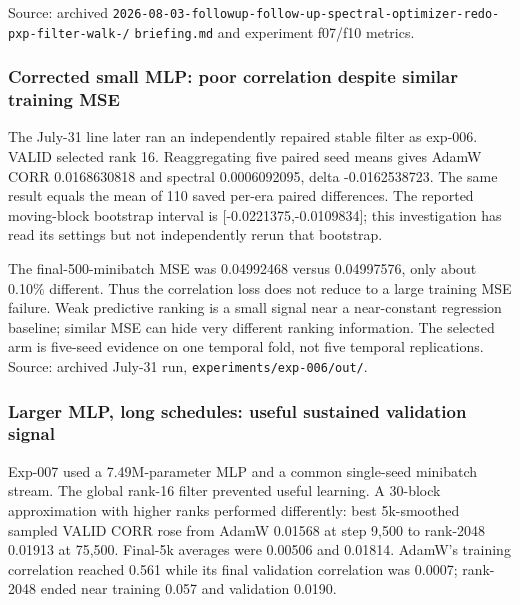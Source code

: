 \documentclass[
  british,
  10pt,
  a4paper,
]{article}
\begin{document}
Source: archived
\texttt{2026-\allowbreak{}08-\allowbreak{}03-\allowbreak{}followup-\allowbreak{}follow-\allowbreak{}up-\allowbreak{}spectral-\allowbreak{}optimizer-\allowbreak{}redo-\allowbreak{}pxp-\allowbreak{}filter-\allowbreak{}walk-\allowbreak{}/\allowbreak{}}
\texttt{briefing.\allowbreak{}md} and experiment f07/f10 metrics.

\subsubsection{Corrected small MLP: poor correlation despite similar
training
MSE}\label{external-studies--corrected-small-mlp-poor-correlation-despite-similar-training-mse}

The July-31 line later ran an independently repaired stable filter as
exp-006. VALID selected rank 16. Reaggregating five paired seed means
gives AdamW CORR 0.\allowbreak{}0168630818 and spectral
0.\allowbreak{}0006092095,\allowbreak{} delta
-\allowbreak{}0.\allowbreak{}0162538723.\allowbreak{} The same result
equals the mean of 110 saved per-era paired differences.\allowbreak{}
The reported moving-\allowbreak{}block bootstrap interval is
[-\allowbreak{}0.\allowbreak{}0221375,\allowbreak{}-\allowbreak{}0.\allowbreak{}0109834];
this investigation has read its settings but not independently rerun
that bootstrap.

The final-\allowbreak{}500-\allowbreak{}minibatch MSE was 0.04992468
versus 0.\allowbreak{}04997576,\allowbreak{} only about 0.10\%
different. Thus the correlation loss does not reduce to a large training
MSE failure. Weak predictive ranking is a small signal near a
near-\allowbreak{}constant regression baseline; similar MSE can hide
very different ranking information.\allowbreak{} The selected arm is
five-seed evidence on one temporal fold, not five temporal
replications\allowbreak{}.\allowbreak{} Source: archived July-31 run,
\texttt{experiments/\allowbreak{}exp-\allowbreak{}006/\allowbreak{}out/\allowbreak{}}.

\subsubsection{Larger MLP, long schedules: useful sustained validation
signal}\label{external-studies--larger-mlp-long-schedules-useful-sustained-validation-signal}

Exp-007 used a 7.\allowbreak{}49M-\allowbreak{}parameter MLP and a
common single-\allowbreak{}seed minibatch stream. The global rank-16
filter prevented useful learning. A 30-block approximation with higher
ranks performed differently: best 5k-\allowbreak{}smoothed sampled VALID
CORR rose from AdamW 0.01568 at step 9,500 to rank-2048 0.01913 at
75,500. Final-5k averages were 0.00506 and 0.01814. AdamW's training
correlation reached 0.561 while its final validation correlation was
0.0007; rank-2048 ended near training 0.057 and validation 0.0190.
\end{document}
